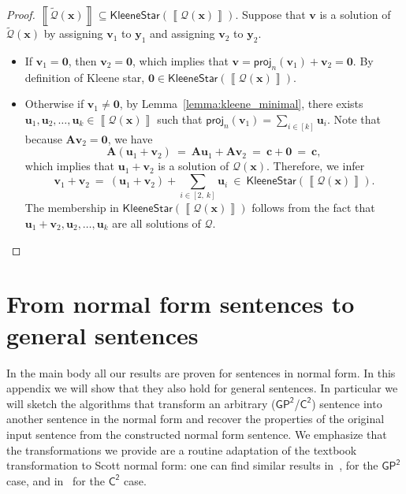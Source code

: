 \documentclass[10pt,a4paper]{article}
\theoremstyle{definition}
\theoremstyle{remark}
\newcommand{\cQ}{\mathcal{Q}}
\newcommand{\cQtilde}{\tilde{\mathcal{Q}}}
\newcommand{\bfA}{\mathbf{A}}
\newcommand{\bfc}{\mathbf{c}}
\newcommand{\bfu}{\mathbf{u}}
\newcommand{\bfv}{\mathbf{v}}
\newcommand{\bfx}{\mathbf{x}}
\newcommand{\bfy}{\mathbf{y}}
\newcommand{\bfzero}{\mathbf{0}}
\newcommand{\Ctwo}    {\mathsf{C^2}}
\newcommand{\GPtwo}   {\mathsf{GP^2}}
\newcommand{\intsinterval}[1]{{\left[ #1 \right]}}
\newcommand{\intinterval}[2] {{\left[ #1 ,\ #2 \right]}}
\newcommand{\projp}[2]     {\mathsf{proj}_{ #1 }\left( #2 \right)}
\newcommand{\kstar}[1] {\mathsf{KleeneStar}\left( #1 \right)}
\newcommand{\sol}[1] {\left\llbracket #1 \right\rrbracket}
\begin{document}
\begin{proof}
    \uline{$\sol{\cQtilde(\bfx)} \subseteq \kstar{\sol{\cQ(\bfx)}}$}.
    Suppose that $\bfv$ is a solution of $\cQtilde(\bfx)$
    by assigning $\bfv_1$  to $\bfy_1$ and assigning $\bfv_2$ to $\bfy_2$.
    \begin{itemize}
        \item
            If $\bfv_1 = \bfzero$, then $\bfv_2 = \bfzero$,
            which implies that
            $\bfv = \projp{n}{\bfv_1} + \bfv_2 = \bfzero$.
            By definition of Kleene star,
            $\bfzero \in \kstar{\sol{\cQ(\bfx)}}$.
        \item
            Otherwise if $\bfv_1 \neq \bfzero$,
            by Lemma~\ref{lemma:kleene_minimal},
            there exists $\bfu_1, \bfu_2, \ldots, \bfu_k \in \sol{\cQ(\bfx)}$ such that
            $\projp{n}{\bfv_1} = \sum_{i \in \intsinterval{k}} \bfu_i$.
            Note that because $\bfA\bfv_2 = \bfzero$, we have
            \begin{equation*}
                \bfA (\bfu_1 + \bfv_2)
                \ =\ \bfA\bfu_1 + \bfA\bfv_2
                \ =\ \bfc + \bfzero
                \ =\ \bfc,
            \end{equation*}
            which implies that $\bfu_1 + \bfv_2$ is a solution of $\cQ(\bfx)$.
            Therefore, we infer
            \begin{equation*}
                \bfv_1 + \bfv_2
                \ =\ (\bfu_1 + \bfv_2) + \sum_{i \in \intinterval{2}{k}} \bfu_i
                \ \in\ \kstar{\sol{\cQ(\bfx)}}.
            \end{equation*}
            The membership in $\kstar{\sol{\cQ(\bfx)}}$
            follows from the fact that $\bfu_1 + \bfv_2,\bfu_2,\ldots,\bfu_k$ are all solutions of $\cQ$.
    \end{itemize}
\end{proof}

\section{From normal form sentences to general sentences} \label{app:normal}

In the main body all our results are proven for sentences in normal form.
In this appendix we will show that they also hold for general sentences.
In particular we will sketch the algorithms that transform an arbitrary ($\GPtwo$/$\Ctwo$) sentence into another sentence in the normal form and recover the properties of the original input sentence from the constructed normal form sentence.
We emphasize that the transformations we provide are a routine adaptation of the textbook transformation to Scott normal form: one can find similar results 
in~\cite{twovarpres}, for the $\GPtwo$ case,
and in~\cite{ctwocomplexity} for the $\Ctwo$ case.
\end{document}
